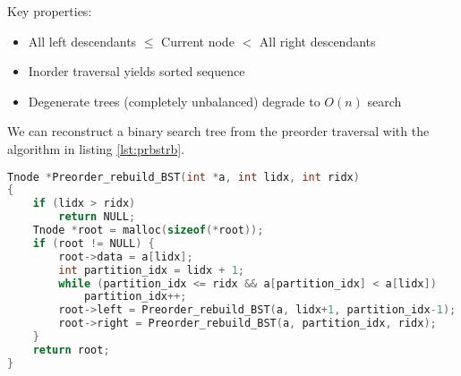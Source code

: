 Key properties:
\begin{itemize}
    \item All left descendants $\leq$ Current node $<$ All right descendants
    \item Inorder traversal yields sorted sequence
    \item Degenerate trees (completely unbalanced) degrade to $O(n)$ search
\end{itemize}

We can reconstruct a binary search tree from the preorder traversal with the
algorithm in listing \ref{lst:prbstrb}.

\begin{lstlisting}[language=C, label={lst:prbstrb}, caption=Reconstruct BST]
Tnode *Preorder_rebuild_BST(int *a, int lidx, int ridx)
{
    if (lidx > ridx)
        return NULL;
    Tnode *root = malloc(sizeof(*root));
    if (root != NULL) {
        root->data = a[lidx];
        int partition_idx = lidx + 1;
        while (partition_idx <= ridx && a[partition_idx] < a[lidx])
            partition_idx++;
        root->left = Preorder_rebuild_BST(a, lidx+1, partition_idx-1);
        root->right = Preorder_rebuild_BST(a, partition_idx, ridx);
    }
    return root;
}
\end{lstlisting}
